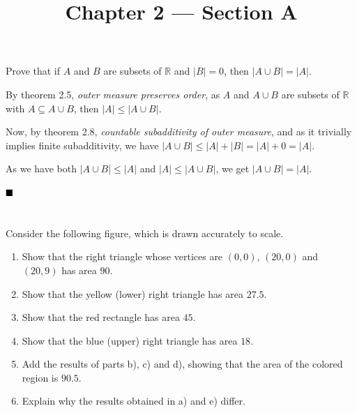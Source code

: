 \documentclass[11pt, a4paper, tikz]{article}
\newcommand{\newpara}{
	\vskip 2mm
}
\newcommand{\centsection}[1]{
	\section*{\centering{#1}}
}
\renewcommand{\qed}{\hfill\blacksquare}
\newcommand{\reals}{
	\ensuremath{\mathbb{R}}
}
\begin{document}
	\title{\textbf{Chapter 2 — Section A}}
	\maketitle
	\centsection{Exercise 1}
	
	\begin{formulationBox}
		Prove that if $A$ and $B$ are subsets of $\reals$ and $|B|=0$, then $|A\cup B| = |A|$.
	\end{formulationBox}
	
	By theorem 2.5, \textit{outer measure preserves order}, as $A$ and $A\cup B$ are subsets of $\reals$ with $A\subseteq A\cup B$, then $|A| \leq |A\cup B|$.
	\newpara
	Now, by theorem 2.8, \textit{countable subadditivity of outer measure}, and as it trivially implies finite subadditivity, we have $|A\cup B| \leq |A| + |B| = |A| + 0 = |A|$.
	\newpara
	As we have both $|A\cup B| \leq |A|$ and $|A| \leq |A\cup B|$, we get $|A\cup B| = |A|$.
	
	$\qed$
	
	\centsection{Exercise 14}
	
	\begin{formulationBox}
		Consider the following figure, which is drawn accurately to scale.
		
		
		\begin{enumerate}[label=\alph*)]
			\item Show that the right triangle whose vertices are $(0,0)$, $(20, 0)$ and $(20, 9)$ has area $90$.
			\item Show that the yellow (lower) right triangle has area $27.5$.
			\item Show that the red rectangle has area $45$.
			\item Show that the blue (upper) right triangle has area $18$.
			\item Add the results of parts b), c) and d), showing that the area of the colored region is $90.5$.
			\item Explain why the results obtained in a) and e) differ.
		\end{enumerate}
	\end{formulationBox}
\end{document}
